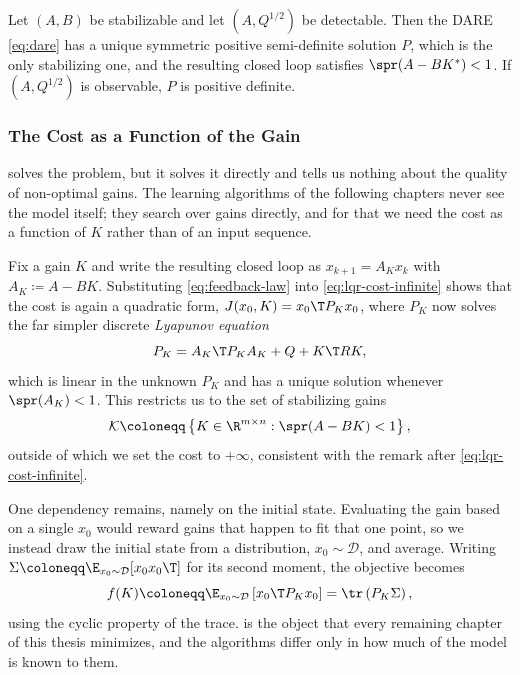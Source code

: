 \begin{theorem}
\label{thm:dare-existence}
Let $(A, B)$ be stabilizable and let $(A, Q^{1/2})$ be detectable. Then the DARE
\eqref{eq:dare} has a unique symmetric positive semi-definite solution $P$, which
is the only stabilizing one, and the resulting closed loop satisfies
$\spr(A - B K^{*}) < 1$. If $(A, Q^{1/2})$ is observable, $P$ is positive
definite.
\end{theorem}

\subsubsection{The Cost as a Function of the Gain}
\label{subsubsec:lqr-cost-of-gain}

 solves the problem, but it solves it directly and
tells us nothing about the quality of non-optimal gains. The learning algorithms of
the following chapters never see the model itself; they search over gains
directly, and for that we need the cost as a function of $K$ rather than of an
input sequence.

Fix a gain $K$ and write the resulting closed loop as
$x_{k+1} = A_K x_k$ with $A_K \coloneqq A - BK$. Substituting
\eqref{eq:feedback-law} into \eqref{eq:lqr-cost-infinite} shows that the cost is
again a quadratic form, $J(x_0, K) = x_0\T P_K x_0$, where $P_K$ now solves
the far simpler discrete \emph{Lyapunov equation}
\begin{equation}
    \label{eq:lyapunov}
    P_K = A_K\T P_K A_K + Q + K\T R K ,
\end{equation}
which is linear in the unknown $P_K$ and has a unique solution whenever
$\spr(A_K) < 1$. This restricts us to the set of stabilizing gains
\begin{equation}
    \label{eq:stabilizing-set}
    \mathcal{K} \coloneqq \left\{ K \in \R^{m \times n} : \spr(A - BK) < 1 \right\} ,
\end{equation}
outside of which we set the cost to $+\infty$, consistent with the remark after
\eqref{eq:lqr-cost-infinite}.

One dependency remains, namely on the initial state. Evaluating the gain
based on a single $x_0$ would reward gains that happen to fit that one
point, so we instead draw the initial state from a distribution,
$x_0 \sim \mathcal{D}$, and average. Writing
$\Sigma \coloneqq \E_{x_0 \sim \mathcal{D}}[x_0 x_0\T]$ for its second moment,
the objective becomes
\begin{equation}
    \label{eq:cost-of-gain}
    f(K) \coloneqq \E_{x_0 \sim \mathcal{D}} \left[ x_0\T P_K x_0 \right]
    = \tr \left( P_K \Sigma \right) ,
\end{equation}
using the cyclic property of the trace.  is the object
that every remaining chapter of this thesis minimizes, and the algorithms differ
only in how much of the model is known to them.

